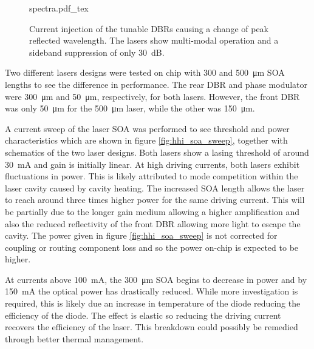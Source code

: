 \begin{figure}[t]
	\centering
	\small	
	\def\svgwidth{0.9\textwidth} 
	{spectra.pdf_tex}
	\caption[Wavelength sweep through current injection of tunable DBRs]{Current injection of the tunable \acp{DBR} causing a change of peak reflected wavelength. The lasers show multi-modal operation and a sideband suppression of only \SI{30}{dB}.}
	\label{fig:hhi_dbr_sweep}
\end{figure}

Two different lasers designs were tested on chip with \num{300} and \SI{500}{\um} \ac{SOA} lengths to see the difference in performance. The rear \ac{DBR} and phase modulator were \SI{300}{\um} and \SI{50}{\um}, respectively, for both lasers. However, the front \ac{DBR} was only \SI{50}{\um} for the \SI{500}{\um} laser, while the other was \SI{150}{\um}.

A current sweep of the laser \ac{SOA} was performed to see threshold and power characteristics which are shown in figure \ref{fig:hhi_soa_sweep}, together with schematics of the two laser designs. Both lasers show a lasing threshold of around \SI{30}{\mA} and gain is initially linear. At high driving currents, both lasers exhibit fluctuations in power. This is likely attributed to mode competition within the laser cavity caused by cavity heating. The increased \ac{SOA} length allows the laser to reach around three times higher power for the same driving current. This will be partially due to the longer gain medium allowing a higher amplification and also the reduced reflectivity of the front \ac{DBR} allowing more light to escape the cavity. The power given in figure \ref{fig:hhi_soa_sweep} is not corrected for coupling or routing component loss and so the power on-chip is expected to be higher. 

At currents above \SI{100}{\mA}, the \SI{300}{\um} \ac{SOA} begins to decrease in power and by \SI{150}{\mA} the optical power has drastically reduced. While more investigation is required, this is likely due an increase in temperature of the diode reducing the efficiency of the diode. The effect is elastic so reducing the driving current recovers the efficiency of the laser. This breakdown could possibly be remedied through better thermal management.


